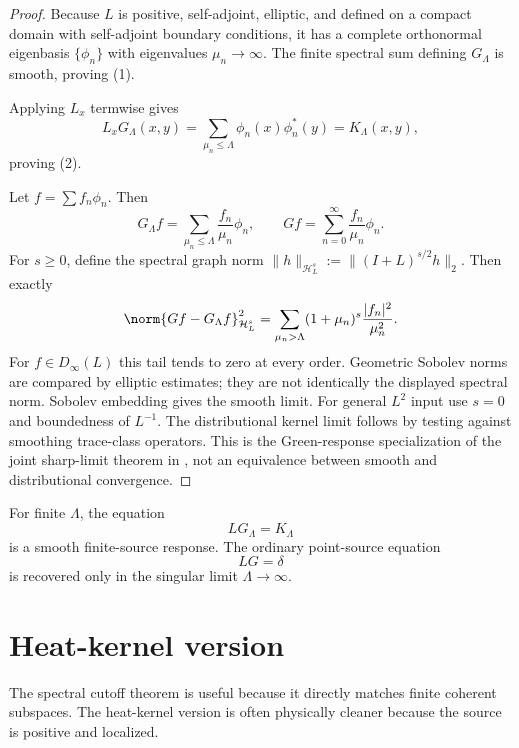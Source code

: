 \documentclass[11pt]{article}
\begin{document}
\begin{proof}
Because \(L\) is positive, self-adjoint, elliptic, and defined on a compact domain with self-adjoint boundary conditions, it has a complete orthonormal eigenbasis \(\{\phi_n\}\) with eigenvalues \(\mu_n\to\infty\). The finite spectral sum defining \(G_\Lambda\) is smooth, proving (1).

Applying \(L_x\) termwise gives
\[
L_xG_\Lambda(x,y)
=
\sum_{\mu_n\le\Lambda}\phi_n(x)\phi_n^*(y)
=
K_\Lambda(x,y),
\]
proving (2).

Let \(f=\sum f_n\phi_n\). Then
\[
G_\Lambda f=\sum_{\mu_n\le\Lambda}\frac{f_n}{\mu_n}\phi_n,
\qquad
Gf=\sum_{n=0}^\infty\frac{f_n}{\mu_n}\phi_n.
\]
For \(s\ge0\), define the spectral graph norm
\(\|h\|_{\mathcal H_L^s}:=\|(I+L)^{s/2}h\|_2\). Then exactly
\[
\norm{Gf-G_\Lambda f}_{\mathcal H_L^s}^2
=
\sum_{\mu_n>\Lambda}(1+\mu_n)^s \frac{|f_n|^2}{\mu_n^2}.
\]
For \(f\in D_\infty(L)\) this tail tends to zero at every order. Geometric
Sobolev norms are compared by elliptic estimates; they are not identically
the displayed spectral norm. Sobolev embedding gives the smooth limit.
For general \(L^2\) input use \(s=0\) and boundedness of \(L^{-1}\).
The distributional kernel limit follows by testing against smoothing
trace-class operators. This is the Green-response specialization of the
joint sharp-limit theorem in \cite{MTTKernel}, not an equivalence between
smooth and distributional convergence.
\end{proof}

\begin{corollary}
For finite \(\Lambda\), the equation
\[
LG_\Lambda=K_\Lambda
\]
is a smooth finite-source response. The ordinary point-source equation
\[
LG=\delta
\]
is recovered only in the singular limit \(\Lambda\to\infty\).
\end{corollary}

\section{Heat-kernel version}

The spectral cutoff theorem is useful because it directly matches finite coherent subspaces. The heat-kernel version is often physically cleaner because the source is positive and localized.
\end{document}
